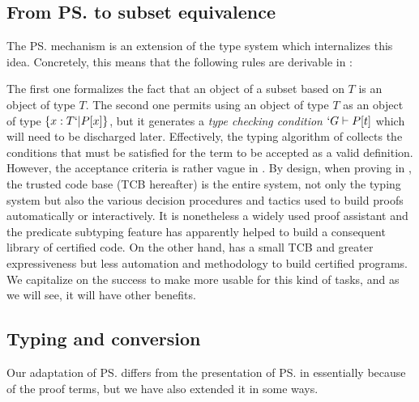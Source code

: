 \documentclass[twocolumn]{article}
\begin{document}
\subsection{From \ps{} to subset equivalence}
The \ps{} mechanism \cite{Rushby98:TSE, Shankar&Owre:WADT99}
is an extension of the \PVS type system which internalizes this idea.
Concretely, this means that the following rules are derivable in \PVS:
\begin{figure}[h]
  \begin{center}
    \DP
    \DP
  \end{center}
  \vspace{-1em}
  \label{PVS:rules}
  \caption{\PVS}
\end{figure}

The first one formalizes the fact that an object of a subset based on
$T$ is an object of type $T$. The second one permits using an object of
type $T$ as an object of type $\{ x : T `| P[x] \}$, but it generates a
\emph{type checking condition} $`G \vdash P[t]$ which will need to be
discharged later. Effectively, the typing algorithm of \PVS{} collects
the conditions that must be satisfied for the term to be accepted as a
valid definition. However, the acceptance criteria is rather vague in
\PVS{}. By design, when proving in \PVS{}, the trusted code base (TCB
hereafter) is the entire system, not only the typing system but also the
various decision procedures and tactics used to build proofs
automatically or interactively. It is nonetheless a widely used proof
assistant and the predicate subtyping feature has apparently helped to
build a consequent library of certified code. On the other hand, \Coq
has a small TCB and greater expressiveness but less automation and
methodology to build certified programs. We capitalize on the \PVS
success to make \Coq more usable for this kind of tasks, and as we will see,
it will have other benefits.

\subsection{Typing and conversion}
Our adaptation of \ps{} differs from the presentation of
\ps{} in \cite{Rushby98:TSE, Shankar&Owre:WADT99} essentially because of the
proof terms, but we have also extended it in some ways. 
\end{document}
